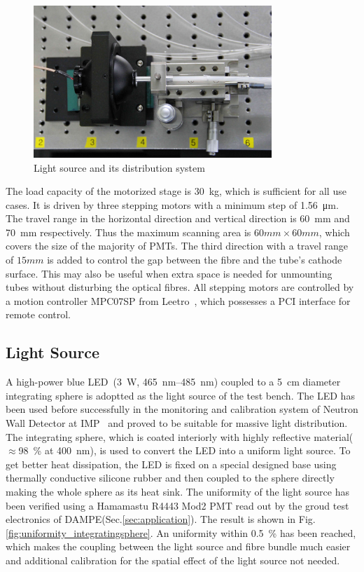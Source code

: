 \documentclass[5p, times]{elsarticle}
\begin{document}
\begin{figure}[t]
 \centering
 \includegraphics[width=90mm]{light_source1_crop}
\caption{Light source and its distribution system}
\label{fig:light_source}
\end{figure} 

The load capacity of the motorized stage is \SI{30}{\kilo\gram}, which is sufficient for all use cases.
It is driven by three stepping motors with a minimum step of \SI{1.56}{\micro\meter}.
The travel range in the horizontal direction and vertical direction is \SI{60}{\milli\meter} and \SI{70}{\milli\meter} respectively.
Thus the maximum scanning area is $60mm\times60mm$, which covers the size of the majority of PMTs.
The third direction with a travel range of $15mm$ is added to control the gap between the fibre and the tube's cathode surface.
This may also be useful when extra space is needed for unmounting tubes without disturbing the optical fibres. 
All stepping motors are controlled by a motion controller MPC07SP from Leetro~\cite{leetro}, which possesses a PCI interface for remote control.

\subsection{Light Source}
\label{sec:light_source}

A high-power blue LED~\cite{zlight}(\SI{3}{\watt}, \SIrange{465}{485}{\nano\meter}) coupled to a \SI{5}{\centi\meter} diameter integrating sphere is adoptted as the light source of the test bench.
The LED has been used before successfully in the monitoring and calibration system of Neutron Wall Detector at IMP~\cite{yuyuhong_led} and proved to be suitable for massive light distribution.
The integrating sphere, which is coated interiorly with highly reflective material($\approx$\SI{98}{\percent} at \SI{400}{\nano\meter}), is used to convert the LED into a uniform light source.
To get better heat dissipation, the LED is fixed on a special designed base using thermally conductive silicone rubber and then coupled to the sphere directly making the whole sphere as its heat sink.
The uniformity of the light source has been verified using a Hamamastu R4443 Mod2 PMT read out by the groud test electronics of DAMPE(Sec.\ref{sec:application}). 
The result is shown in Fig.\ref{fig:uniformity_integratingsphere}. 
An uniformity within \textpm\SI{0.5}{\percent} has been reached, which makes the coupling between the light source and fibre bundle much easier and additional calibration for the spatial effect of the light source not needed. 
\end{document}
